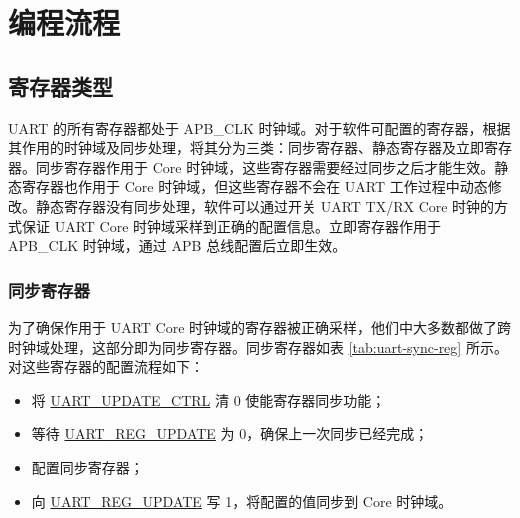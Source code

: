 \documentclass[main\_\_CN.tex]{subfiles}
\begin{document}
\section{编程流程}\label{sec:uart-program}

\subsection{寄存器类型}

UART 的所有寄存器都处于 APB\_CLK 时钟域。对于软件可配置的寄存器，根据其作用的时钟域及同步处理，将其分为三类：同步寄存器、静态寄存器及立即寄存器。同步寄存器作用于 Core 时钟域，这些寄存器需要经过同步之后才能生效。静态寄存器也作用于 Core 时钟域，但这些寄存器不会在 UART 工作过程中动态修改。静态寄存器没有同步处理，软件可以通过开关 UART TX/RX Core 时钟的方式保证 UART Core 时钟域采样到正确的配置信息。立即寄存器作用于 APB\_CLK 时钟域，通过 APB 总线配置后立即生效。

\subsubsection{同步寄存器}

为了确保作用于 UART Core 时钟域的寄存器被正确采样，他们中大多数都做了跨时钟域处理，这部分即为同步寄存器。同步寄存器如表 \ref{tab:uart-sync-reg} 所示。对这些寄存器的配置流程如下：

\begin{itemize}
    \item 将 \hyperref[fielddesc:UARTUPDATECTRL]{UART\_UPDATE\_CTRL} 清 0 使能寄存器同步功能；
    \item 等待 \hyperref[fielddesc:UARTREGUPDATE]{UART\_REG\_UPDATE} 为 0，确保上一次同步已经完成；
    \item 配置同步寄存器；
    \item 向 \hyperref[fielddesc:UARTREGUPDATE]{UART\_REG\_UPDATE} 写 1，将配置的值同步到 Core 时钟域。
\end{itemize}
\end{document}
